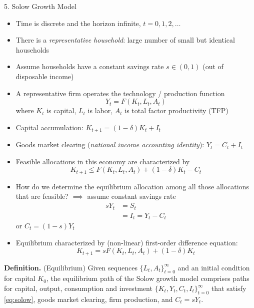 \documentclass[10pt]{beamer}
\begin{document}
\begin{frame}{5. Solow Growth Model}
\begin{itemize}
\item Time is discrete and the horizon infinite, $t = 0, 1, 2, \ldots$

\item There is a \textit{representative household}: large number of small but identical households

\item Assume households have a constant savings rate $s \in (0, 1)$ (out of disposable income)

\item A representative firm operates the technology / production function
\begin{equation*}
	Y_t = F(K_t, L_t, A_t)
\end{equation*}
where $K_t$ is capital, $L_t$ is labor, $A_t$ is total factor productivity (TFP)

\item Capital accumulation: $K_{t+1} = (1-\delta) K_t + I_t$

\item Goods market clearing (\textit{national income accounting identity}): $Y_t = C_t + I_t$
\end{itemize}
\end{frame}


\begin{frame}{}
\begin{itemize}
\item Feasible allocations in this economy are characterized by
\begin{equation*}
	K_{t+1} \leq F(K_t, L_t, A_t) + (1-\delta)K_t - C_t 
\end{equation*}

\item How do we determine the equilibrium allocation among all those allocations that are feasible? $\implies$ assume constant savings rate
\begin{align*}
	s Y_t &= S_t \\
	&= I_t = Y_t - C_t
\end{align*}
or $C_t = (1-s) Y_t$

\item Equilibrium characterized by (non-linear) first-order difference equation:
\begin{equation}\label{eq:solow}
	K_{t+1} = s F(K_t, L_t, A_t) + (1-\delta) K_t
\end{equation}
\end{itemize}

\textbf{Definition.} (Equilibrium) Given sequences $\{L_t, A_t\}_{t=0}^\infty$ and an initial condition for capital $K_0$, the equilibrium path of the Solow growth model comprises paths for capital, output, consumption and investment $\{K_t, Y_t, C_t, I_t\}_{t=0}^\infty$ that satisfy \eqref{eq:solow}, goods market clearing, firm production, and $C_t = sY_t$.
\end{frame}
\end{document}
